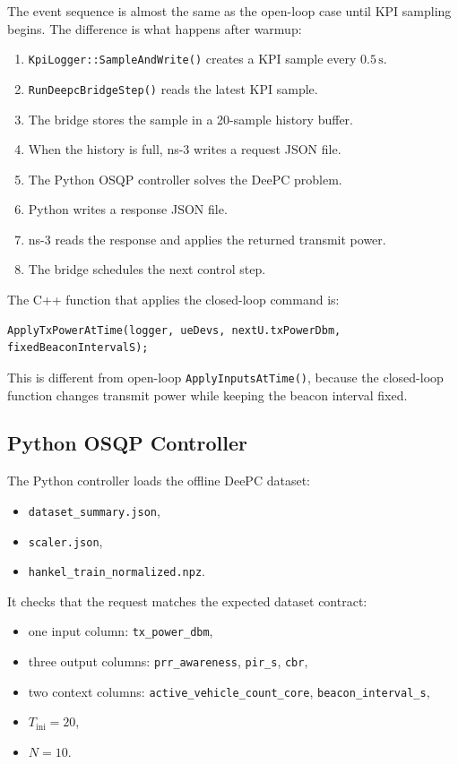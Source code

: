 \documentclass[11pt,a4paper]{article}
\begin{document}
The event sequence is almost the same as the open-loop case until KPI sampling begins. The difference is what happens after warmup:

\begin{enumerate}
    \item \texttt{KpiLogger::SampleAndWrite()} creates a KPI sample every \(0.5\,\mathrm{s}\).
    \item \texttt{RunDeepcBridgeStep()} reads the latest KPI sample.
    \item The bridge stores the sample in a 20-sample history buffer.
    \item When the history is full, ns-3 writes a request JSON file.
    \item The Python OSQP controller solves the DeePC problem.
    \item Python writes a response JSON file.
    \item ns-3 reads the response and applies the returned transmit power.
    \item The bridge schedules the next control step.
\end{enumerate}

The C++ function that applies the closed-loop command is:

\begin{lstlisting}[style=cppstyle]
ApplyTxPowerAtTime(logger, ueDevs, nextU.txPowerDbm, fixedBeaconIntervalS);
\end{lstlisting}

This is different from open-loop \texttt{ApplyInputsAtTime()}, because the closed-loop function changes transmit power while keeping the beacon interval fixed.

\subsection{Python OSQP Controller}

The Python controller loads the offline DeePC dataset:

\begin{itemize}
    \item \texttt{dataset\_summary.json},
    \item \texttt{scaler.json},
    \item \texttt{hankel\_train\_normalized.npz}.
\end{itemize}

It checks that the request matches the expected dataset contract:

\begin{itemize}
    \item one input column: \texttt{tx\_power\_dbm},
    \item three output columns: \texttt{prr\_awareness}, \texttt{pir\_s}, \texttt{cbr},
    \item two context columns: \texttt{active\_vehicle\_count\_core}, \texttt{beacon\_interval\_s},
    \item \(T_{\mathrm{ini}}=20\),
    \item \(N=10\).
\end{itemize}
\end{document}
